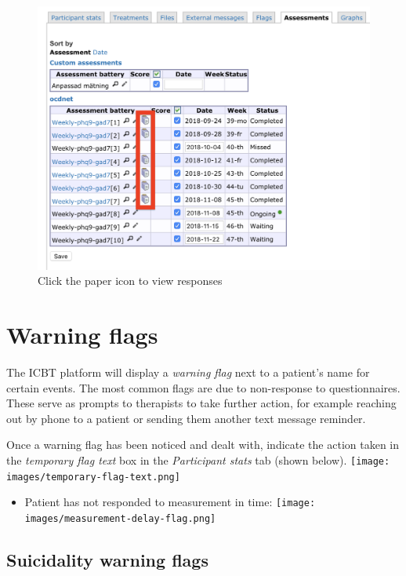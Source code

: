 \documentclass[]{book}
\providecommand{\tightlist}{%
  \setlength{\itemsep}{0pt}\setlength{\parskip}{0pt}}
\theoremstyle{definition}
\theoremstyle{definition}
\theoremstyle{definition}
\theoremstyle{remark}
\begin{document}
\begin{figure}
\centering
\includegraphics{images/assessments-list.png}
\caption{Click the paper icon to view responses}
\end{figure}

\hypertarget{warning-flags}{%
\section{Warning flags}\label{warning-flags}}

The ICBT platform will display a \emph{warning flag} next to a patient's
name for certain events. The most common flags are due to non-response
to questionnaires. These serve as prompts to therapists to take further
action, for example reaching out by phone to a patient or sending them
another text message reminder.

Once a warning flag has been noticed and dealt with, indicate the action
taken in the \emph{temporary flag text} box in the \emph{Participant
stats} tab (shown below).
\texttt{[image: images/temporary-flag-text.png]}

\begin{itemize}
\tightlist
\item
  Patient has not responded to measurement in time:
  \texttt{[image: images/measurement-delay-flag.png]}
\end{itemize}

\hypertarget{suicidality-warning-flags}{%
\subsection{Suicidality warning flags}\label{suicidality-warning-flags}}
\end{document}
